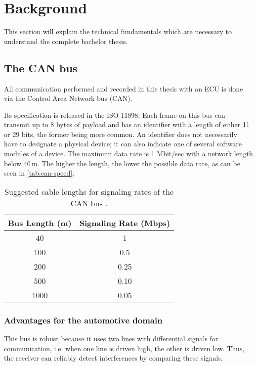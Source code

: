 \chapter{Background}

This section will explain the technical fundamentals which are necessary to understand the complete bachelor thesis.


\section{The CAN bus}

All communication performed and recorded in this thesis with an ECU is done via the Control Area Network bus (CAN).

Its specification is released in the ISO 11898. Each frame on this bus can transmit up to 8 bytes of payload and has an identifier with a length of either 11 or 29 bits, the former being more common. An identifier does not necessarily have to designate a physical device; it can also indicate one of several software modules of a device.
The maximum data rate is 1 Mbit/sec with a network length below 40\,m. The higher the length, the lower the possible data rate, as can be seen in \autoref{tab:can-speed}.

\begin{table}[htb]
    \centering
    \begin{tabular}{cc}
    \hline
    \textbf{Bus Length (m)} & \textbf{Signaling Rate (Mbps)}\\
    \hline
    40 & 1 \\
    100 & 0.5 \\
    200 & 0.25 \\
    500 & 0.10 \\
    1000 & 0.05 \\
    \hline
\end{tabular}
\caption{Suggested cable lengths for signaling rates of the CAN bus \cite{slla270}.}
\label{tab:can-speed}
\end{table}

\subsection{Advantages for the automotive domain}

This bus is robust because it uses two lines with differential signals for communication, i.e. when one line is driven high, the other is driven low. Thus, the receiver can reliably detect interferences by comparing these signals.

